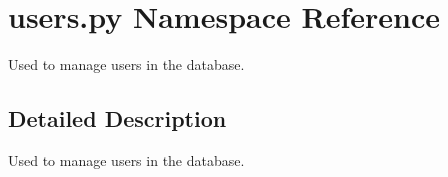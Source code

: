 \hypertarget{namespaceusers_1_1py}{}\section{users.\+py Namespace Reference}
\label{namespaceusers_1_1py}


Used to manage users in the database.  




\subsection{Detailed Description}
Used to manage users in the database. 